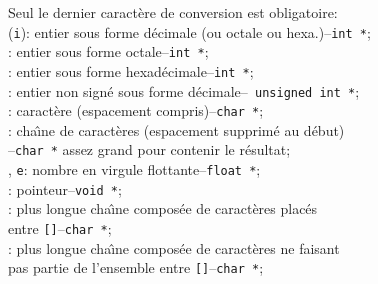 \begin{frame}
\newpage
Seul le dernier caract\`ere de conversion est obligatoire:\\
\hspace*{5mm}{\tt d} ({\tt i}): entier sous forme d\'ecimale (ou octale ou hexa.)--{\tt int *};\\
\hspace*{5mm}{\tt o}: entier sous forme octale--{\tt int *};\\
\hspace*{5mm}{\tt x}: entier sous forme hexad\'ecimale--{\tt int *};\\
\hspace*{5mm}{\tt u}: entier non sign\'e sous forme d\'ecimale--{\tt
  unsigned int *};\\
\hspace*{5mm}{\tt c}: caract\`ere (espacement compris)--{\tt char *};\\
\hspace*{5mm}{\tt s}: cha\^\i{}ne de caract\`eres (espacement supprim\'e au
d\'ebut)\\
\hspace*{7mm}--{\tt char *} assez grand pour contenir le r\'esultat;\\
\hspace*{5mm}{\tt f}, {\tt e}: nombre en virgule flottante--{\tt float
  *};\\
\hspace*{5mm}{\tt p}: pointeur--{\tt void *};\\
\hspace*{5mm}{\tt [..]}: plus longue cha\^\i{}ne compos\'ee de caract\`eres
plac\'es\\
\hspace*{7mm} entre {\tt []}--{\tt char *};\\
\hspace*{5mm}{\tt [..]}: plus longue cha\^\i{}ne compos\'ee de caract\`eres
ne faisant\\
\hspace*{7mm} pas partie de l'ensemble entre {\tt []}--{\tt char *};\\


\end{frame}

